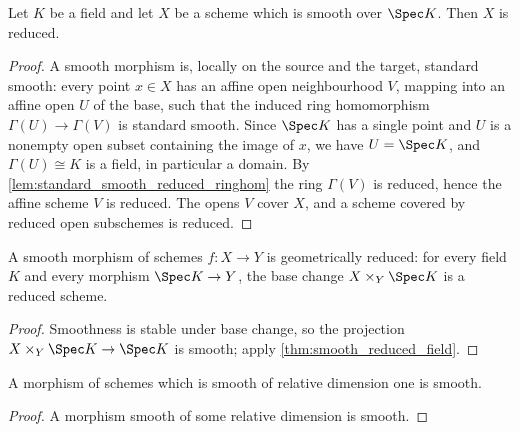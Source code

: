 \begin{theorem}
  \label{thm:smooth_reduced_field}
  \leanok
  Let \(K\) be a field and let \(X\) be a scheme which is smooth over \(\Spec K\). Then \(X\)
  is reduced.
\end{theorem}
\begin{proof}
  \leanok
  A smooth morphism is, locally on the source and the target, standard smooth: every point
  \(x \in X\) has an affine open neighbourhood \(V\), mapping into an affine open \(U\) of the
  base, such that the induced ring homomorphism \(\Gamma(U) \to \Gamma(V)\) is standard
  smooth. Since \(\Spec K\) has a single point and \(U\) is a nonempty open subset containing
  the image of \(x\), we have \(U = \Spec K\), and \(\Gamma(U) \cong K\) is a field, in
  particular a domain. By \ref{lem:standard_smooth_reduced_ringhom} the ring \(\Gamma(V)\) is
  reduced, hence the affine scheme \(V\) is reduced. The opens \(V\) cover \(X\), and a scheme
  covered by reduced open subschemes is reduced.
\end{proof}

\begin{theorem}
  \label{thm:smooth_geometrically_reduced}
  \leanok
  A smooth morphism of schemes \(f : X \to Y\) is geometrically reduced: for every field \(K\)
  and every morphism \(\Spec K \to Y\), the base change \(X \times_Y \Spec K\) is a reduced
  scheme.
\end{theorem}
\begin{proof}
  \leanok
  Smoothness is stable under base change, so the projection
  \(X \times_Y \Spec K \to \Spec K\) is smooth; apply \ref{thm:smooth_reduced_field}.
\end{proof}

\begin{lemma}
  \label{lem:smooth_of_relDim_one}
  \leanok
  A morphism of schemes which is smooth of relative dimension one is smooth.
\end{lemma}
\begin{proof}
  \leanok
  A morphism smooth of some relative dimension is smooth.
\end{proof}

